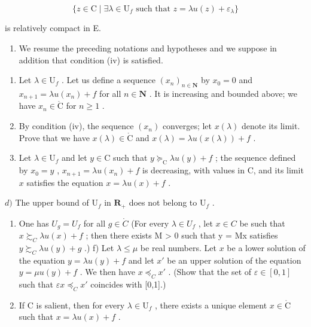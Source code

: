 \[
\{z \in \mathrm{C} \mid \exists \lambda \in \mathrm{U}_{f}\text{ such that } z = \lambda u(z) + \varepsilon_{\lambda} \}
\]

is relatively compact in E.

\begin{enumerate}
\def\labelenumi{\arabic{enumi})}
\setcounter{enumi}{25}
\tightlist
\item
  We resume the preceding notations and hypotheses and we suppose in addition that condition (iv) is satisfied.
\end{enumerate}

\begin{enumerate}
\def\labelenumi{\alph{enumi})}
\item
  Let \(\lambda \in \mathrm{U}_f\) . Let us define a sequence \((x_n)_{n \in \mathbf{N}}\) by \(x_0 = 0\) and \(x_{n+1} = \lambda u(x_n) + f\) for all \(n \in \mathbf{N}\) . It is increasing and bounded above; we have \(x_n \in \mathring{\mathrm{C}}\) for \(n \geqslant 1\) .
\item
  By condition (iv), the sequence \((x_{n})\) converges; let \(x(\lambda)\) denote its limit. Prove that we have \(x(\lambda) \in \mathring{\mathrm{C}}\) and \(x(\lambda) = \lambda u(x(\lambda)) + f\) .
\item
  Let \(\lambda \in \mathrm{U}_f\) and let \(y \in \mathrm{C}\) such that \(y \succcurlyeq_{\mathrm{C}} \lambda u(y) + f\) ; the sequence defined by \(x_0 = y\) , \(x_{n+1} = \lambda u(x_n) + f\) is decreasing, with values in C, and its limit \(x\) satisfies the equation \(x = \lambda u(x) + f\) .
\end{enumerate}

\(d)\) The upper bound of \(\mathrm{U}_{f}\) in \(\mathbf{R}_{+}\) does not belong to \(\mathrm{U}_{f}\) .

\begin{enumerate}
\def\labelenumi{\alph{enumi})}
\setcounter{enumi}{4}
\item
  One has \(U_{g} = U_{f}\) for all \(g \in \mathring{C}\) (For every \(\lambda \in U_{f}\) , let \(x \in C\) be such that \(x \succsim_{C} \lambda u(x) + f\) ; then there exists M \textgreater{} 0 such that y = Mx satisfies \(y \succsim_{C} \lambda u(y) + g\) .) f) Let \(\lambda \leqslant \mu\) be real numbers. Let \(x\) be a lower solution of the equation \(y = \lambda u(y) + f\) and let \(x'\) be an upper solution of the equation \(y = \mu u(y) + f\) . We then have \(x \preccurlyeq_{C} x'\) . (Show that the set of \(\varepsilon \in [0,1]\) such that \(\varepsilon x \preccurlyeq_{C} x'\) coincides with {[}0,1{]}.)
\item
  If C is salient, then for every \(\lambda \in \mathrm{U}_f\) , there exists a unique element \(x \in \mathring{\mathrm{C}}\) such that \(x = \lambda u(x) + f\) .
\end{enumerate}

